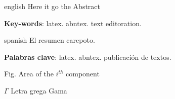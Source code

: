\documentclass[
	12pt,				%
	openright,			%
	oneside,			%
	a4paper,			%
	english,			%
	french,				%
	spanish,			%
	brazil				%
	]{abntex2}
\begin{document}
\begin{resumo}[Abstract]
 \begin{otherlanguage*}{english}
   Here it go the Abstract

   \vspace{\onelineskip}
 
   \noindent 
   \textbf{Key-words}: latex. abntex. text editoration.
 \end{otherlanguage*}
\end{resumo}

\begin{resumo}[Resumen]
 \begin{otherlanguage*}{spanish}
   El resumen carepoto.
  
   \textbf{Palabras clave}: latex. abntex. publicación de textos.
 \end{otherlanguage*}
\end{resumo}

\listoffigures*
\cleardoublepage

\listoftables*
\cleardoublepage

\begin{siglas}
  \item[Fig.] Area of the $i^{th}$ component
\end{siglas}

\begin{simbolos}
  \item[$ \Gamma $] Letra grega Gama
\end{simbolos}

\tableofcontents*
\cleardoublepage



\textual
\end{document}
